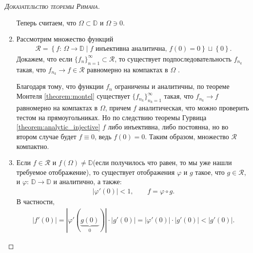 \documentclass[../complex-analysis.tex]{subfiles}
\begin{document}
\begin{proof}[\normalfont\textsc{Доказательство теоремы Римана}]
\begin{enumerate}
   Теперь считаем, что $ \Omega \subset \mathbb D $ и $ \Omega \ni 0 $.

  \item Рассмотрим множество функций
   \begin{align*}
    \mathcal R = \left\{ f \colon\,\Omega \to \mathbb D \mid f \text{ инъективна аналитична, } f(0) = 0  \right\} \sqcup \left\{ 0 \right\}.
   \end{align*} 
Докажем, что если $ \{ f_n \}_{n=1}^\infty \subset \mathcal R$, то существует подпоследовательность $ f_{n_k} $ такая, что  $ f_{n_k} \to f \in \mathcal R $ равномерно на компактах в $ \Omega $ .

Благодаря тому, что функции $f_n$ ограничены и аналитичны, по теореме Монтеля \eqref{theorem:montel} существует $ \{f_{n_k}\}_{n_k=1}^{\infty}   $ такая, что $ f_{n_k} \to f $ равномерно на компактах в $ \Omega $, причем $ f $ аналитическая, что можно проверить тестом на прямоугольниках.
Но по следствию теоремы Гурвица \eqref{theorem:analytic_injective} $ f $ либо инъективна, либо постоянна, но во втором случае будет $ f \equiv 0 $, ведь $ f(0) = 0 $.
Таким образом, множество $ \mathcal R $ компактно.

  \item Если $ f \in \mathcal R $ и $ f(\Omega) \neq \mathbb D $(если получилось что равен, то мы уже нашли требуемое отображение), то существует отображения $ \varphi $ и $ g $ такое, что $ g \in \mathcal R $, и $ \varphi\colon\,\mathbb D \to \mathbb D $ и аналитично, а также:
   \begin{align*}
    \left| \varphi'(0) \right| < 1, \qquad f = \varphi \circ g.
   \end{align*} В частности,
   \begin{align*}
	\left| f'(0) \right| = \left| \varphi'(\underbrace{g(0)}_{0}) \right| \cdot \left| g'(0) \right| = \left| \varphi'(0) \right| \cdot \left| g'(0) \right| < \left| g'(0) \right|.
   \end{align*}


\end{enumerate}
\end{proof}
\end{document}

